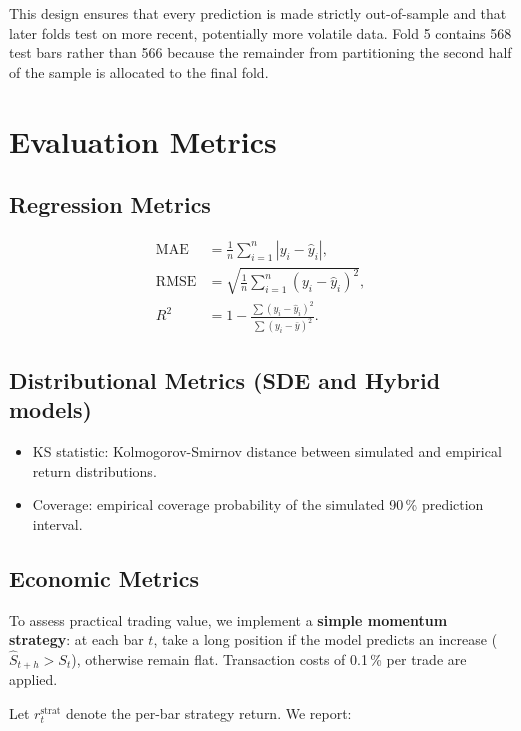 \documentclass[12pt, a4paper, oneside]{report}
\theoremstyle{plain}
\theoremstyle{definition}
\theoremstyle{remark}
\begin{document}
This design ensures that every prediction is made strictly out-of-sample and
that later folds test on more recent, potentially more volatile data.  Fold 5
contains 568 test bars rather than 566 because the remainder from partitioning
the second half of the sample is allocated to the final fold.

\section{Evaluation Metrics}

\subsection{Regression Metrics}

\begin{align}
  \text{MAE} &= \tfrac{1}{n}\textstyle\sum_{i=1}^n |y_i - \hat y_i|, \\
  \text{RMSE} &= \sqrt{\tfrac{1}{n}\textstyle\sum_{i=1}^n (y_i - \hat y_i)^2}, \\
  R^2 &= 1 - \tfrac{\textstyle\sum (y_i - \hat y_i)^2}{\textstyle\sum (y_i - \bar y)^2}.
\end{align}

\subsection{Distributional Metrics (SDE and Hybrid models)}

\begin{itemize}[leftmargin=1.25cm]
  \item KS statistic: Kolmogorov-Smirnov distance between simulated and
    empirical return distributions.
  \item Coverage: empirical coverage probability of the simulated 90\,\%
    prediction interval.
\end{itemize}

\subsection{Economic Metrics}
\label{sec:econ_metrics}

To assess practical trading value, we implement a \textbf{simple momentum
strategy}: at each bar $t$, take a long position if the model predicts an
increase ($\hat S_{t+h} > S_t$), otherwise remain flat.  Transaction costs of
0.1\,\% per trade are applied.

Let $r_t^{\text{strat}}$ denote the per-bar strategy return.  We report:
\end{document}
